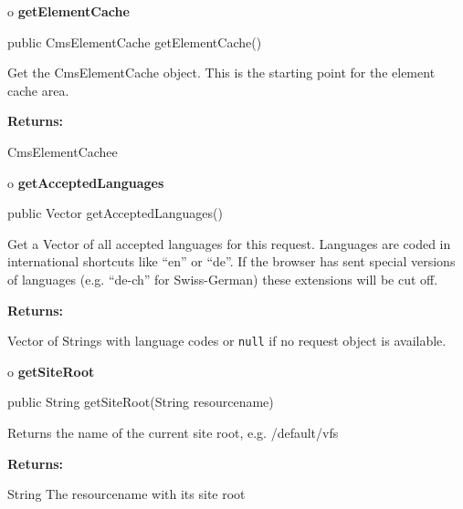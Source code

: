 o {\bf getElementCache} 

\begin{PRE}
 public CmsElementCache getElementCache()
\end{PRE}

\begin{description}
\htmlDD Get the CmsElementCache object. This is the starting point for the
element cache area. 

\begin{description}
\item {\bf Returns:}  

CmsElementCachee  
\end{description}

\end{description}

o {\bf getAcceptedLanguages} 

\begin{PRE}
 public Vector getAcceptedLanguages()
\end{PRE}

\begin{description}
\htmlDD Get a Vector of all accepted languages for this request. Languages are
coded in international shortcuts like ``en'' or ``de''. If the browser has
sent special versions of languages (e.g. ``de-ch'' for Swiss-German) these
extensions will be cut off. 

\begin{description}
\item {\bf Returns:}  

Vector of Strings with language codes or {\tt null} if no request object is
available.  
\end{description}

\end{description}

o {\bf getSiteRoot} 

\begin{PRE}
 public String getSiteRoot(String resourcename)
\end{PRE}

\begin{description}
\htmlDD Returns the name of the current site root, e.g. /default/vfs 

\begin{description}
\item {\bf Returns:}  

String The resourcename with its site root  
\end{description}

\end{description}

